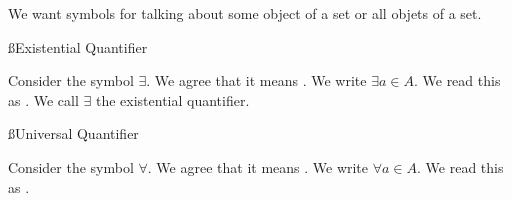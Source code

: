 

We want symbols for talking about some object of a set or all objets of a set.


\ss{Existential Quantifier}

Consider the symbol $\exists$.
We agree that it means .
We write $\exists a \in A$.
We read this as .
We call $\exists$ the existential quantifier.

\ss{Universal Quantifier}

Consider the symbol $\forall$.
We agree that it means .
We write $\forall a \in A$.
We read this as .

\blankpage
